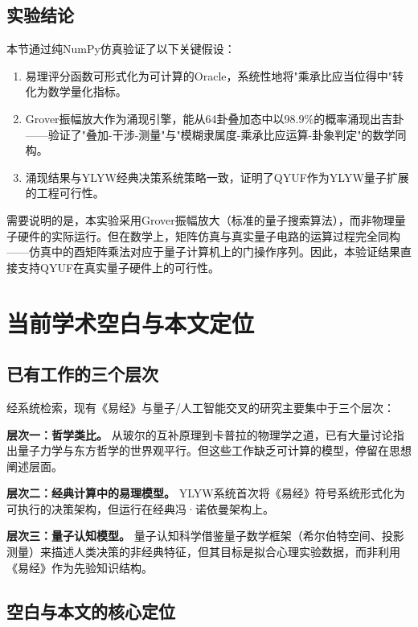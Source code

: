\documentclass[twocolumn]{article}
\begin{document}
\subsection{实验结论}

本节通过纯NumPy仿真验证了以下关键假设：
\begin{enumerate}
  \item 易理评分函数可形式化为可计算的Oracle，系统性地将"乘承比应当位得中"转化为数学量化指标。
  \item Grover振幅放大作为涌现引擎，能从64卦叠加态中以98.9\%的概率涌现出吉卦——验证了"叠加-干涉-测量"与"模糊隶属度-乘承比应运算-卦象判定"的数学同构。
  \item 涌现结果与YLYW经典决策系统策略一致，证明了QYUF作为YLYW量子扩展的工程可行性。
\end{enumerate}

需要说明的是，本实验采用Grover振幅放大（标准的量子搜索算法），而非物理量子硬件的实际运行。但在数学上，矩阵仿真与真实量子电路的运算过程完全同构——仿真中的酉矩阵乘法对应于量子计算机上的门操作序列。因此，本验证结果直接支持QYUF在真实量子硬件上的可行性。

\section{当前学术空白与本文定位}

\subsection{已有工作的三个层次}

经系统检索，现有《易经》与量子/人工智能交叉的研究主要集中于三个层次：

\textbf{层次一：哲学类比。} 从玻尔的互补原理到卡普拉的物理学之道\cite{capra1975}，已有大量讨论指出量子力学与东方哲学的世界观平行。但这些工作缺乏可计算的模型，停留在思想阐述层面。

\textbf{层次二：经典计算中的易理模型。} YLYW系统\cite{ylyw2026}首次将《易经》符号系统形式化为可执行的决策架构，但运行在经典冯·诺依曼架构上。

\textbf{层次三：量子认知模型。} 量子认知科学\cite{busemeyer2015}借鉴量子数学框架（希尔伯特空间、投影测量）来描述人类决策的非经典特征，但其目标是拟合心理实验数据，而非利用《易经》作为先验知识结构。

\subsection{空白与本文的核心定位}
\end{document}
